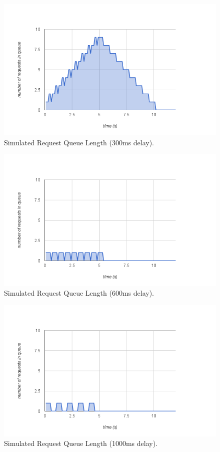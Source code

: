 \documentclass[se,resubmit]{uw-wkrpt}
\begin{document}
\begin{figure}
  \centering
  \includegraphics{sim-300ms}
  \caption{Simulated Request Queue Length (300ms delay).}
  \label{fig:sim-300ms}
\end{figure}

\begin{figure}
  \centering
  \includegraphics{sim-600ms}
  \caption{Simulated Request Queue Length (600ms delay).}
  \label{fig:sim-600ms}
\end{figure}

\begin{figure}
  \centering
  \includegraphics{sim-1000ms}
  \caption{Simulated Request Queue Length (1000ms delay).}
  \label{fig:sim-1000ms}
\end{figure}
\end{document}
